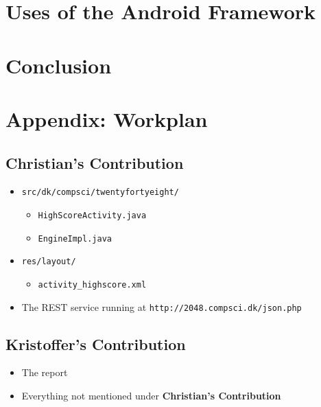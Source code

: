 \documentclass[a4paper, 12pt]{article}
\newcommand{\code}[1]{\texttt{#1}}
\begin{document}
\section{Uses of the Android Framework}

\section{Conclusion}

\newpage
\section{Appendix: Workplan}
\subsection{Christian's Contribution}
\begin{itemize}
\item \code{src/dk/compsci/twentyfortyeight/}
  \begin{itemize}
  \item \code{HighScoreActivity.java}
  \item \code{EngineImpl.java}
  \end{itemize}
\item \code{res/layout/}
  \begin{itemize}
  \item \code{activity\_highscore.xml}
  \end{itemize}
\item The REST service running at \code{http://2048.compsci.dk/json.php}
\end{itemize}
\subsection{Kristoffer's Contribution}
\begin{itemize}
\item The report
\item Everything not mentioned under \textbf{Christian's Contribution}
\end{itemize}
\end{document}
